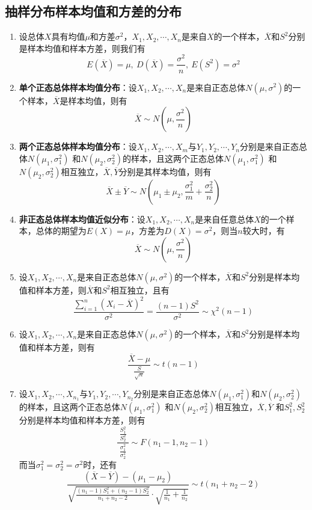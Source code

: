 \documentclass[12pt,a4paper,UTF8]{book}
\begin{document}
\subsection{抽样分布样本均值和方差的分布}
\begin{enumerate}
\item 设总体$X$具有均值$\mu$和方差$\sigma^2$，$X_1,X_2,\cdots,X_n$是来自$X$的一个样本，$\overline{X}$和$S^2$分别是样本均值和样本方差，则我们有
\[E\left(\overline{X}\right)=\mu,\ D\left(\overline{X}\right)=\frac{\sigma^2}{n},\ E\left(S^2\right)=\sigma^2\]
\item \textbf{单个正态总体样本均值分布}：设$X_1,X_2,\cdots,X_n$是来自正态总体$N\left(\mu,\sigma^2\right)$的一个样本，$\overline{X}$是样本均值，则有
\[\overline{X}\sim N\left(\mu,\frac{\sigma^2}{n}\right)\]
\item \textbf{两个正态总体样本均值分布}：设$X_1,X_2,\cdots,X_m$与$Y_1,Y_2,\cdots,Y_n$分别是来自正态总体$N\left(\mu_1,\sigma_1^2\right)$ 和$N\left(\mu_2,\sigma_2^2\right)$的样本，且这两个正态总体$N\left(\mu_1,\sigma_1^2\right)$ 和$N\left(\mu_2,\sigma_2^2\right)$相互独立，$\overline{X},\overline{Y}$分别是其样本均值，则有
\[\overline{X}\pm\overline{Y}\sim N\left(\mu_1\pm\mu_2,\frac{\sigma_1^2}{m}+\frac{\sigma_2^2}{n}\right)\]
\item \textbf{非正态总体样本均值近似分布}：设$X_1,X_2,\cdots,X_n$是来自任意总体$X$的一个样本，总体的期望为$E\left(X\right)=\mu$，方差为$D\left(X\right)=\sigma^2$，则当$n$较大时，有
\[\overline{X}\sim N\left(\mu,\frac{\sigma^2}{n}\right)\]
\item 设$X_1,X_2,\cdots,X_n$是来自正态总体$N\left(\mu,\sigma^2\right)$的一个样本，$\overline{X}$和$S^2$分别是样本均值和样本方差，则$\overline{X}$和$S^2$相互独立，且有
\[\frac{\sum\limits_{i=1}^{n}\left(X_i-\overline{X}\right)^2}{\sigma^2}=\frac{\left(n-1\right)S^2}{\sigma^2}\sim\chi^2\left(n-1\right)\]
\item 设$X_1,X_2,\cdots,X_n$是来自正态总体$N\left(\mu,\sigma^2\right)$的一个样本，$\overline{X}$和$S^2$分别是样本均值和样本方差，则有
\[\frac{\overline{X}-\mu}{\frac{S}{\sqrt{n}}}\sim t\left(n-1\right)\]
\item 设$X_1,X_2,\cdots,X_{n_1}$与$Y_1,Y_2,\cdots,Y_{n_2}$分别是来自正态总体$N\left(\mu_1,\sigma_1^2\right)$和$N\left(\mu_2,\sigma_2^2\right)$的样本，且这两个正态总体$N\left(\mu_1,\sigma_1^2\right)$ 和$N\left(\mu_2,\sigma_2^2\right)$相互独立，$\overline{X},\overline{Y}$ 和$S_1^2,S_2^2$分别是样本均值和样本方差，则有
\[\frac{\ \frac{S_1^2}{S_2^2}\ }{\ \frac{\sigma_1^2}{\sigma_2^2}\ }\sim F\left(n_1-1,n_2-1\right)\]
而当$\sigma_1^2=\sigma_2^2=\sigma^2$时，还有
\[\frac{\left(\overline{X}-\overline{Y}\right)-\left(\mu_1-\mu_2\right)}{\sqrt{\frac{\left(n_1-1\right)S_1^2+\left(n_2-1\right)S_2^2}{n_1+n_2-2}}\cdot\sqrt{\frac{1}{n_1}+\frac{1}{n_2}}}\sim t\left(n_1+n_2-2\right)\]
\end{enumerate}
\end{document}
